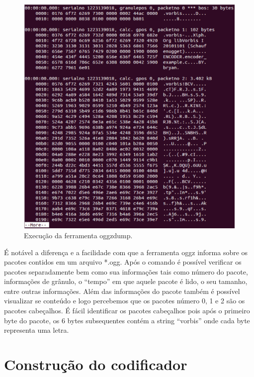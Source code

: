  \begin{figure}[ht]
	\centering
		\includegraphics[keepaspectratio=true,scale=0.5]{figuras/oggz-dump.eps}
	\caption{Execução da ferramenta oggzdump.}
	\label{oggzdump}
\end{figure}

É notável a diferença e a facilidade com que a ferramenta oggz informa sobre os pacotes contidos em um arquivo *.ogg. Após o comando é possível verificar os pacotes separadamente bem como sua informações tais como número do pacote, informações de grânulo, o ``tempo'' em que aquele pacote é lido, o seu tamanho, entre outras informações. Além das informações do pacote também é possível visualizar se conteúdo e logo percebemos que os pacotes número 0, 1 e 2 são os pacotes cabeçalhos. É fácil identificar os pacotes cabeçalhos pois após o primeiro byte do pacote, os 6 bytes subsequentes contém a string ``vorbis'' onde cada byte representa uma letra.

\section{Construção do codificador}

